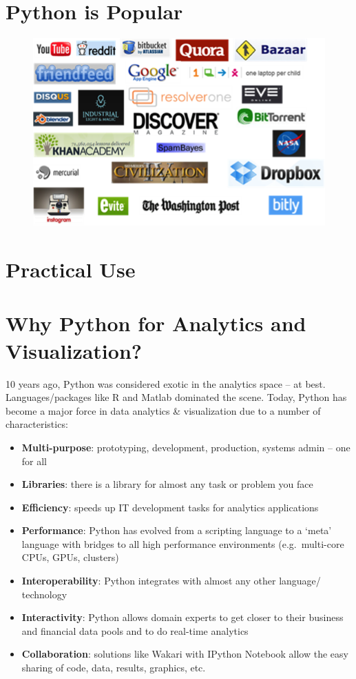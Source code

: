 \documentclass{article}
\begin{document}
    \section{Python is Popular}

\begin{figure}[htbp]
\centering
\includegraphics{static/img/python_companies2.png}
\end{figure}

    \section{Practical Use}

    \section{Why Python for Analytics and Visualization?}

10 years ago, Python was considered exotic in the analytics space -- at
best. Languages/packages like R and Matlab dominated the scene. Today,
Python has become a major force in data analytics \& visualization due
to a number of characteristics:

\begin{itemize}
\item
  \textbf{Multi-purpose}: prototyping, development, production, systems
  admin -- one for all
\item
  \textbf{Libraries}: there is a library for almost any task or problem
  you face
\item
  \textbf{Efficiency}: speeds up IT development tasks for analytics
  applications
\item
  \textbf{Performance}: Python has evolved from a scripting language to
  a `meta' language with bridges to all high performance environments
  (e.g.~multi-core CPUs, GPUs, clusters)
\item
  \textbf{Interoperability}: Python integrates with almost any other
  language/ technology
\item
  \textbf{Interactivity}: Python allows domain experts to get closer to
  their business and financial data pools and to do real-time analytics
\item
  \textbf{Collaboration}: solutions like Wakari with IPython Notebook
  allow the easy sharing of code, data, results, graphics, etc.
\end{itemize}
\end{document}
